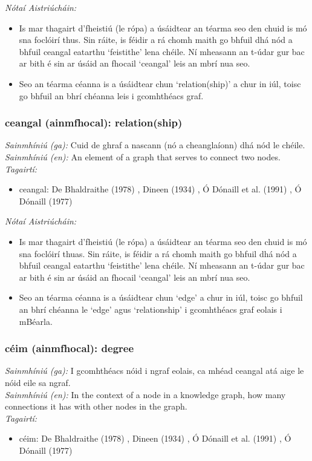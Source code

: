 \documentclass{article}
\begin{document}
 \noindent \textit{Nótaí Aistriúcháin:}
\begin{itemize}
	\item Is mar thagairt d'fheistiú (le rópa) a úsáidtear an téarma seo den chuid is mó sna foclóirí thus. Sin ráite, is féidir a rá chomh maith go bhfuil dhá nód a bhfuil ceangal eatarthu `feistithe' lena chéile. Ní mheasann an t-údar gur bac ar bith é sin ar úsáid an fhocail `ceangal' leis an mbrí nua seo.
	\item Seo an téarma céanna is a úsáidtear chun `relation(ship)' a chur in iúl, toisc go bhfuil an bhrí chéanna leis i gcomhthéacs graf.
\end{itemize}


\subsubsection*{ceangal (ainmfhocal): relation(ship)}
 \noindent \textit{Sainmhíniú (ga):} Cuid de ghraf a nascann (nó a cheanglaíonn) dhá nód le chéile.
\\
 \noindent \textit{Sainmhíniú (en):} An element of a graph that serves to connect two nodes.
\\
 \noindent \textit{Tagairtí:}
\begin{itemize}
	\item ceangal: De Bhaldraithe (1978) \cite{de-bhaldraithe}, Dineen (1934) \cite{dineen}, Ó Dónaill et al. (1991) \cite{focloir-beag}, Ó Dónaill (1977) \cite{odonaill}
\end{itemize}

 \noindent \textit{Nótaí Aistriúcháin:}
\begin{itemize}
	\item Is mar thagairt d'fheistiú (le rópa) a úsáidtear an téarma seo den chuid is mó sna foclóirí thuas. Sin ráite, is féidir a rá chomh maith go bhfuil dhá nód a bhfuil ceangal eatarthu `feistithe' lena chéile. Ní mheasann an t-údar gur bac ar bith é sin ar úsáid an fhocail `ceangal' leis an mbrí nua seo.
	\item Seo an téarma céanna is a úsáidtear chun `edge' a chur in iúl, toisc go bhfuil an bhrí chéanna le `edge' agus `relationship' i gcomhthéacs graf eolais i mBéarla.
\end{itemize}


\subsubsection*{céim (ainmfhocal): degree}
 \noindent \textit{Sainmhíniú (ga):} I gcomhthéacs nóid i ngraf eolais, ca mhéad ceangal atá aige le nóid eile sa ngraf.
\\
 \noindent \textit{Sainmhíniú (en):} In the context of a node in a knowledge graph, how many connections it has with other nodes in the graph.
\\
 \noindent \textit{Tagairtí:}
\begin{itemize}
	\item céim: De Bhaldraithe (1978) \cite{de-bhaldraithe}, Dineen (1934) \cite{dineen}, Ó Dónaill et al. (1991) \cite{focloir-beag}, Ó Dónaill (1977) \cite{odonaill}
\end{itemize}
\end{document}
